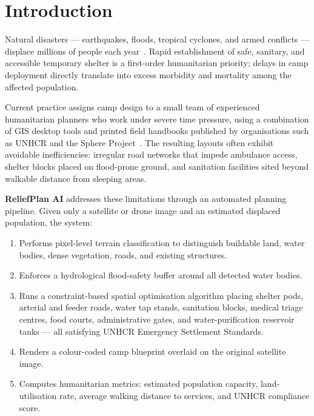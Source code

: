 \documentclass[twocolumn]{article}
\begin{document}
\section{Introduction}
\label{sec:intro}

Natural disasters --- earthquakes, floods, tropical cyclones, and armed conflicts --- displace
millions of people each year~\cite{unhcr_handbook}.
Rapid establishment of safe, sanitary, and accessible temporary shelter is a first-order
humanitarian priority; delays in camp deployment directly translate into excess morbidity and
mortality among the affected population.

Current practice assigns camp design to a small team of experienced humanitarian planners who work
under severe time pressure, using a combination of GIS desktop tools and printed field handbooks
published by organisations such as UNHCR and the Sphere Project~\cite{sphere_handbook}.
The resulting layouts often exhibit avoidable inefficiencies: irregular road networks that impede
ambulance access, shelter blocks placed on flood-prone ground, and sanitation facilities sited
beyond walkable distance from sleeping areas.

\textbf{ReliefPlan AI} addresses these limitations through an automated planning pipeline.
Given only a satellite or drone image and an estimated displaced population, the system:
\begin{enumerate}[leftmargin=*,nosep,topsep=2pt]
  \item Performs pixel-level terrain classification to distinguish buildable land, water bodies,
        dense vegetation, roads, and existing structures.
  \item Enforces a hydrological flood-safety buffer around all detected water bodies.
  \item Runs a constraint-based spatial optimisation algorithm placing shelter pods, arterial and
        feeder roads, water tap stands, sanitation blocks, medical triage centres, food courts,
        administrative gates, and water-purification reservoir tanks --- all satisfying UNHCR
        Emergency Settlement Standards.
  \item Renders a colour-coded camp blueprint overlaid on the original satellite image.
  \item Computes humanitarian metrics: estimated population capacity, land-utilisation rate,
        average walking distance to services, and UNHCR compliance score.
\end{enumerate}
\end{document}
